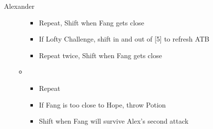 \begin{battle}[1:29]{Alexander}
\begin{itemize}
\begin{itemize}
			            \begin{itemize}
				            \item Repeat, Shift when Fang gets close
				            \item If Lofty Challenge, shift in and out of [5] to refresh ATB
				            \item Repeat twice, Shift when Fang gets close
			            \end{itemize}
			      \item \first
			            \begin{itemize}
				            \item Repeat
				            \item If Fang is too close to Hope, throw Potion
				            \item Shift when Fang will survive Alex's second attack
			            \end{itemize}
		      \end{itemize}
	\end{itemize}
\end{battle}
\vfill
